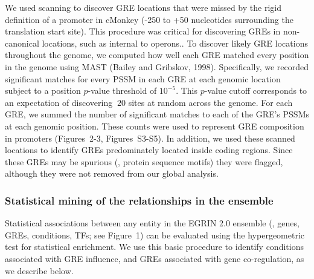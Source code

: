 We used scanning to discover GRE locations that were missed by the
rigid definition of a promoter in cMonkey (-250 to +50 nucleotides
surrounding the translation start site). This procedure was critical
for discovering GREs in non-canonical locations, such as internal to
operons.. To discover likely GRE locations throughout the genome, we
computed how well each GRE matched every position in the genome using
MAST (Bailey and Gribskov, 1998). Specifically, we recorded
significant matches for every PSSM in each GRE at each genomic
location subject to a position $p$-value threshold of $10^{-5}$. This
$p$-value cutoff corresponds to an expectation of discovering $~20$ sites
at random across the genome. For each GRE, we summed the number of
significant matches to each of the GRE’s PSSMs at each genomic
position. These counts were used to represent GRE composition in
promoters (Figures~2-3, Figures~S3-S5). In addition, we used these
scanned locations to identify GREs predominately located inside coding
regions. Since these GREs may be spurious (\eg, protein sequence
motifs) they were flagged, although they were not removed from our
global analysis.

\subsubsection{Statistical mining of the relationships in the ensemble}

Statistical associations between any entity in the EGRIN 2.0 ensemble
(\ie, genes, GREs, conditions, TFs; see Figure~1) can be evaluated
using the hypergeometric test for statistical enrichment. We use this
basic procedure to identify conditions associated with GRE influence,
and GREs associated with gene co-regulation, as we describe below.
